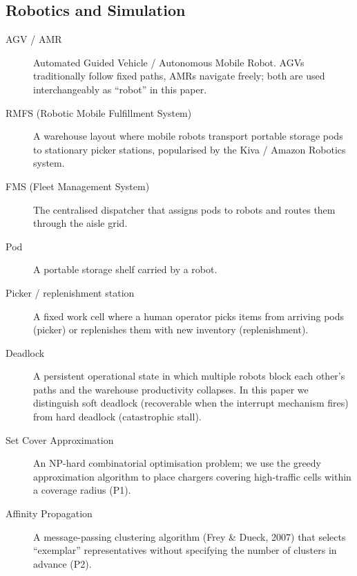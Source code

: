 \documentclass[conference]{IEEEtran}
\begin{document}
\subsection*{Robotics and Simulation}
\begin{description}
  \item[AGV / AMR] Automated Guided Vehicle / Autonomous Mobile Robot. AGVs traditionally follow fixed paths, AMRs navigate freely; both are used interchangeably as ``robot'' in this paper.
  \item[RMFS (Robotic Mobile Fulfillment System)] A warehouse layout where mobile robots transport portable storage pods to stationary picker stations, popularised by the Kiva / Amazon Robotics system.
  \item[FMS (Fleet Management System)] The centralised dispatcher that assigns pods to robots and routes them through the aisle grid.
  \item[Pod] A portable storage shelf carried by a robot.
  \item[Picker / replenishment station] A fixed work cell where a human operator picks items from arriving pods (picker) or replenishes them with new inventory (replenishment).
  \item[Deadlock] A persistent operational state in which multiple robots block each other's paths and the warehouse productivity collapses. In this paper we distinguish soft deadlock (recoverable when the interrupt mechanism fires) from hard deadlock (catastrophic stall).
  \item[Set Cover Approximation] An NP-hard combinatorial optimisation problem; we use the greedy approximation algorithm to place chargers covering high-traffic cells within a coverage radius (P1).
  \item[Affinity Propagation] A message-passing clustering algorithm (Frey \& Dueck, 2007) that selects ``exemplar'' representatives without specifying the number of clusters in advance (P2).
\end{description}
\end{document}
